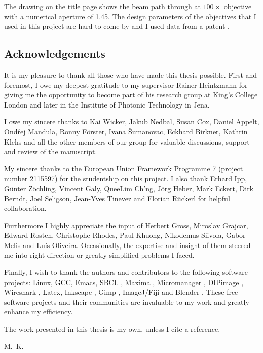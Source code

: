 \documentclass[oneside,a4paper,12pt,BCOR20mm,DIV14]{scrbook} %
\begin{document}
The drawing on the title page shows the beam path through at
$100\times$ objective with a numerical aperture of 1.45. The design
parameters of the objectives that I used in this project are hard to
come by and I used data from a patent \citep{Matthae2003}.


\subsection*{Acknowledgements}
It is my pleasure to thank all those who have made this thesis
possible. First and foremost, I owe my deepest gratitude to my
supervisor Rainer Heintzmann for giving me the opportunity to become
part of his research group at King's College London and later in the
Institute of Photonic Technology in Jena.

I owe my sincere thanks to Kai Wicker, Jakub Nedbal, Susan Cox, Daniel
Appelt, Ond\v rej Mandula, Ronny F\"orster, Ivana \v Sumanovac,
Eckhard Birkner, Kathrin Klehs and all the other members of our group
for valuable discussions, support and review of the manuscript.

My sincere thanks to the European Union Framework Programme 7 (project
number 2115597) for the studentship on this project.  I also thank
Erhard Ipp, G\"unter Z\"ochling, Vincent Galy, QueeLim Ch'ng, J\"org
Heber, Mark Eckert, Dirk Berndt, Joel Seligson, Jean-Yves Tinevez and
Florian R\"uckerl for helpful collaboration.

Furthermore I highly appreciate the input of Herbert Gross, Miroslav
Grajcar, Edward Rosten, Christophe Rhodes, Paul Khuong, Nikodemus
Siivola, Gabor Melis and Lu\' is Oliveira. Occasionally, the expertise
and insight of them steered me into right direction or greatly
simplified problems I faced.

Finally, I wish to thank the authors and contributors to the following
software projects: Linux, GCC, Emacs, SBCL \citep{Rhodes2008}, Maxima
\citep{Maxima.sourceforge.net2013}, Micromanager
\citep{Edelstein2010}, DIPimage \citep{dipimage}, Wireshark
\citep{wireshark}, Latex, Inkscape \citep{inkscape}, Gimp
\citep{gimp}, ImageJ/Fiji \citep{Abramoff,Schindelin2012} and Blender
\cite{blender}.  These free software projects and their communities
are invaluable to my work and greatly enhance my efficiency.

The work presented in this thesis is my own, unless I cite a
reference.

\begin{flushright}
  M.~K.
\end{flushright}
\end{document}

